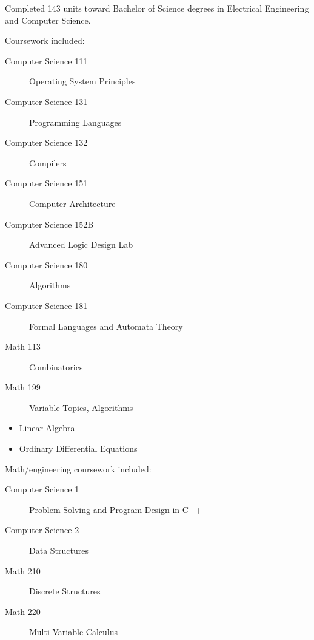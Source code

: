 \begin{resume}
\title{\relax}
\location{\relax}
\begin{position}
  Completed 143 units toward Bachelor of Science degrees in Electrical
  Engineering and Computer Science.

 Coursework included:
  \begin{description}
  \item[Computer Science 111] Operating System Principles
  \item[Computer Science 131] Programming Languages
  \item[Computer Science 132] Compilers
  \item[Computer Science 151] Computer Architecture
  \item[Computer Science 152B] Advanced Logic Design Lab
  \item[Computer Science 180] Algorithms
  \item[Computer Science 181] Formal Languages and Automata Theory
  \item[Math 113] Combinatorics
  \item[Math 199] Variable Topics, Algorithms
  \end{description}
\end{position}

\begin{position}
  \vspace{-1em}
  \begin{itemize}
  \item Linear Algebra
  \item Ordinary Differential Equations
  \end{itemize}
\end{position}

\title{\relax}
\begin{position}
  Math/engineering coursework included:
  \begin{description}
  \item[Computer Science 1] Problem Solving and Program Design in C++ 
  \item[Computer Science 2] Data Structures
  \item[Math 210] Discrete Structures
  \item[Math 220] Multi-Variable Calculus
  \end{description}    
\end{position}

\location{\relax}
\title{\relax}
\begin{position}
  \relax
\end{position}

\end{resume}

